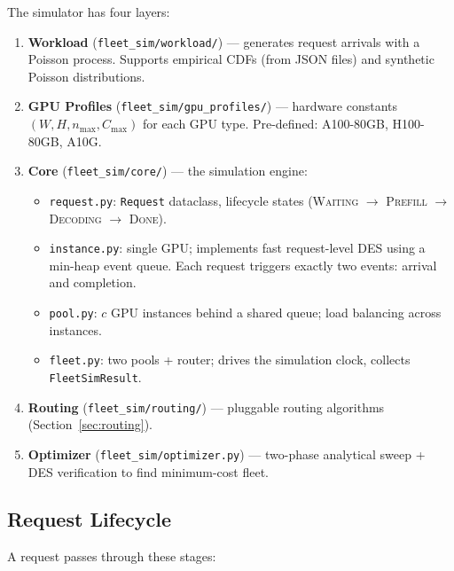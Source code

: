 \documentclass[11pt,a4paper]{article}
\begin{document}
The simulator has four layers:

\begin{enumerate}[nosep]
  \item \textbf{Workload} (\texttt{fleet\_sim/workload/}) --- generates
    request arrivals with a Poisson process.  Supports empirical CDFs
    (from JSON files) and synthetic Poisson distributions.

  \item \textbf{GPU Profiles} (\texttt{fleet\_sim/gpu\_profiles/}) ---
    hardware constants $(W, H, n_{\max}, C_{\max})$ for each GPU type.
    Pre-defined: A100-80GB, H100-80GB, A10G.

  \item \textbf{Core} (\texttt{fleet\_sim/core/}) --- the simulation
    engine:
    \begin{itemize}[nosep]
      \item \texttt{request.py}: \texttt{Request} dataclass, lifecycle
        states (\textsc{Waiting} $\to$ \textsc{Prefill} $\to$
        \textsc{Decoding} $\to$ \textsc{Done}).
      \item \texttt{instance.py}: single GPU; implements fast
        request-level DES using a min-heap event queue.  Each request
        triggers exactly two events: arrival and completion.
      \item \texttt{pool.py}: $c$ GPU instances behind a shared queue;
        load balancing across instances.
      \item \texttt{fleet.py}: two pools + router; drives the
        simulation clock, collects \texttt{FleetSimResult}.
    \end{itemize}

  \item \textbf{Routing} (\texttt{fleet\_sim/routing/}) --- pluggable
    routing algorithms (Section~\ref{sec:routing}).

  \item \textbf{Optimizer} (\texttt{fleet\_sim/optimizer.py}) --- two-phase
    analytical sweep + DES verification to find minimum-cost fleet.
\end{enumerate}

\subsection{Request Lifecycle}

A request passes through these stages:
\end{document}
